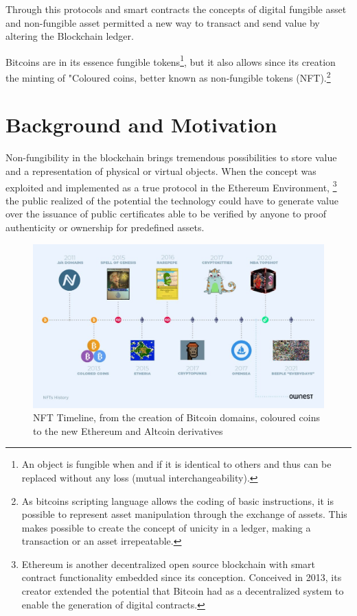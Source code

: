 Through this protocols and smart contracts the concepts of digital fungible asset and  non-fungible asset permitted a new way to transact and send value by altering the Blockchain ledger.

Bitcoins are in its essence fungible tokens\footnote{An object is fungible when and if it is identical to others and thus can be replaced without any loss (mutual interchangeability).}, but it also allows since its creation the minting of "Coloured coins, better known as non-fungible tokens (NFT).\footnote{As bitcoins scripting language allows the coding of basic instructions, it is possible to represent asset manipulation through the exchange of assets. This makes possible to create the concept of unicity in a ledger, making a transaction or an asset irrepeatable.}

\section{Background and Motivation}
\label{sec:motivation}
Non-fungibility in the blockchain brings tremendous possibilities to store value and a representation of physical or virtual objects. When the concept was exploited and implemented as a true protocol in the Ethereum Environment, \footnote{Ethereum is another decentralized open source blockchain with smart contract functionality embedded since its conception. Conceived in 2013, its creator extended the potential that Bitcoin had as a decentralized system to enable the generation of digital contracts.} the public realized of the potential the technology could have to generate value over the issuance of public certificates able to be verified by anyone to proof authenticity or ownership for predefined assets. 
\begin{figure}[h]
\includegraphics[width=15cm]{img/01-NFT_Timeline.png}
\centering
\caption{NFT Timeline, from the creation of Bitcoin domains, coloured coins to the new Ethereum and Altcoin derivatives  \cite{OwnestNF21:online}}
\end{figure}

